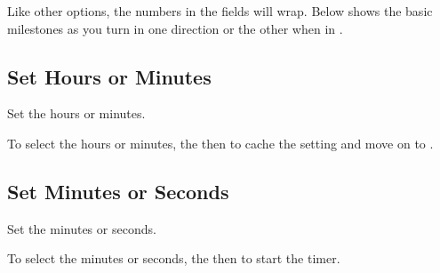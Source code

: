 
Like other options, the numbers in the fields will wrap.  Below shows the basic
milestones as you turn in one direction or the other when in .


\subsection{Set Hours or Minutes} 

Set the hours or minutes.

\par\medskip

To select the hours or minutes,  the  then  to cache the
setting and move on to .


\subsection{Set Minutes or Seconds} 

Set the minutes or seconds.

\par\medskip

To select the minutes or seconds,  the  then  to start the
timer.


